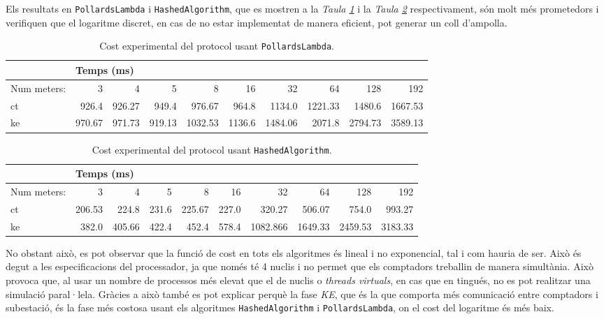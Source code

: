 Els resultats en \texttt{PollardsLambda} i \texttt{HashedAlgorithm}, que es mostren a la \textit{Taula \ref{tab:pollards}} i la \textit{Taula \ref{tab:hashed}} respectivament, són molt més prometedors i verifiquen que el logaritme discret, en cas de no estar implementat de manera eficient, pot generar un coll d'ampolla.

\begin{table}[H]
	\centering
	\begin{tabular}{lrrrrrrrrr}
		\centering
		&\multicolumn{9}{l}{\centering Temps (ms)}\\
		\toprule
		Num meters: &           3  &       4  &           5  &            8  &              16  &         32  &         64  &      128 &     192 \\
		\midrule
		ct &  926.4 &  926.27 &  949.4 &  976.67 &  964.8 &  1134.0 &  1221.33 &  1480.6 &  1667.53 \\
		ke &  970.67 &  971.73&  919.13&  1032.53 &  1136.6 &  1484.06 &  2071.8 &  2794.73 &  3589.13 \\
		\bottomrule
	\end{tabular}
	\caption{Cost experimental del protocol usant \texttt{PollardsLambda}.}
	\label{tab:pollards}
\end{table}
\begin{table}[H]
	\centering
	\begin{tabular}{lrrrrrrrrr}
		\centering
		&\multicolumn{9}{l}{\centering Temps (ms)}\\
		\toprule
		Num meters: &           3  &       4  &           5  &            8  &              16  &         32  &         64  &      128 &     192 \\
		\midrule
		ct &  206.53 &  224.8 &  231.6 &  225.67 &  227.0 &  320.27 &  506.07 &  754.0 &  993.27 \\
		ke &  382.0 &  405.66 &  422.4 &  452.4 &  578.4 &  1082.866 &  1649.33 &  2459.53 &  3183.33 \\
		\bottomrule
	\end{tabular}
	\caption{Cost experimental del protocol usant \texttt{HashedAlgorithm}.}
	\label{tab:hashed}
\end{table}
No obstant això, es pot observar que la funció de cost en tots els algoritmes és lineal i no exponencial, tal i com hauria de ser. Això és degut a les especificacions del processador, ja que només té 4 nuclis i no permet que els comptadors treballin de manera simultània. Això provoca que, al usar un nombre de processos més elevat que el de nuclis o \textit{threads virtuals}, en cas que en tingués, no es pot realitzar una simulació paral·lela. Gràcies a això també es pot explicar perquè la fase \textit{KE}, que és la que comporta més comunicació entre comptadors i subestació, és la fase més costosa usant els algoritmes \texttt{HashedAlgorithm} i \texttt{PollardsLambda}, on el cost del logaritme és més baix.
